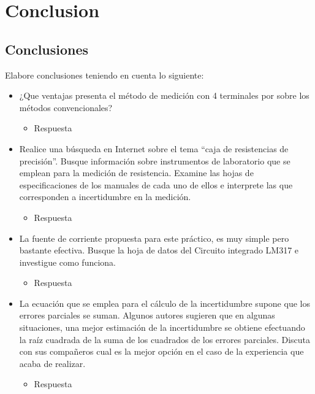\chapter{Conclusion}
\section{Conclusiones}
Elabore conclusiones teniendo en cuenta lo siguiente:
\begin{itemize}
  \item ¿Que ventajas presenta el método de medición con 4 terminales  por sobre los métodos convencionales?
    \begin{itemize}
      \item Respuesta
    \end{itemize}
  \item Realice una búsqueda en Internet  sobre el tema “caja de resistencias de precisión”. Busque información sobre instrumentos de laboratorio que se emplean para la medición de resistencia. Examine las hojas de especificaciones de los  manuales  de cada uno de ellos e interprete las que corresponden a incertidumbre en la medición.
    \begin{itemize}
      \item Respuesta
    \end{itemize}
  \item La fuente de corriente propuesta para  este práctico, es muy simple pero bastante efectiva. Busque la hoja de datos del Circuito integrado LM317 e investigue como funciona.
    \begin{itemize}
      \item Respuesta
    \end{itemize}
  \item La ecuación que se emplea para el cálculo de la incertidumbre supone que los errores  parciales se suman. Algunos autores  sugieren que en algunas situaciones, una mejor estimación  de la incertidumbre se obtiene  efectuando la raíz cuadrada de la suma de los cuadrados de los errores parciales. Discuta con sus compañeros cual es la mejor opción en el caso de la experiencia que acaba de realizar.  
    \begin{itemize}
      \item Respuesta
    \end{itemize}
\end{itemize}
